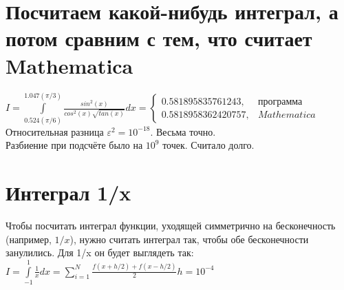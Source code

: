 \documentclass[12pt,a4paper]{scrartcl}
\begin{document}
	\section{Посчитаем какой-нибудь интеграл, а потом сравним с тем, что считает Mathematica}
	 $I = \int\limits_{0.524 (\pi/6)}^{1.047 (\pi/3)} \frac{sin^2(x)}{cos^2(x) \sqrt{tan(x)}}dx =
	 \begin{cases}
	    0.581895835761243,  & \text{программа} \\
	 	0.5818958362420757, & Mathematica
	 	
	 \end{cases}$
	 \\
	 Относительная разница $\varepsilon^2 = 10^{-18}$. Весьма точно.
	 \\
	 Разбиение при подсчёте было на $10^9$ точек. Считало долго.
	\section{Интеграл 1/x}
	Чтобы посчитать интеграл функции, уходящей симметрично на бесконечность (например, $1/x$), нужно считать интеграл так, чтобы обе бесконечности занулились.
	Для 1/x он будет выглядеть так: 
	$I = \int\limits_{-1}^1 \frac{1}{x}dx =  \sum_{i=1}^N  \frac{f(x+h/2)+f(x-h/2)}{2} h = 10^{-4}$
\end{document}

